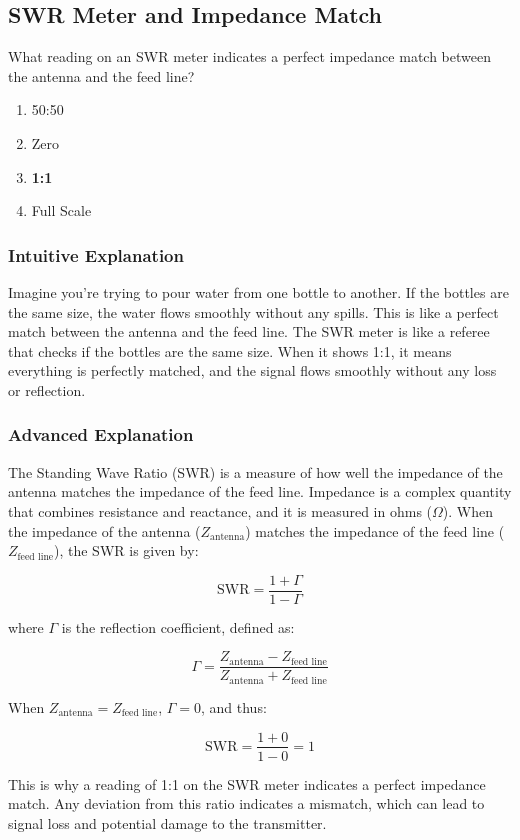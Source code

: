 \subsection{SWR Meter and Impedance Match}
\label{T7C04}

\begin{tcolorbox}[colback=gray!10!white,colframe=black!75!black,title=T7C04]
What reading on an SWR meter indicates a perfect impedance match between the antenna and the feed line?
\begin{enumerate}[label=\Alph*)]
    \item 50:50
    \item Zero
    \item \textbf{1:1}
    \item Full Scale
\end{enumerate}
\end{tcolorbox}

\subsubsection{Intuitive Explanation}
Imagine you're trying to pour water from one bottle to another. If the bottles are the same size, the water flows smoothly without any spills. This is like a perfect match between the antenna and the feed line. The SWR meter is like a referee that checks if the bottles are the same size. When it shows 1:1, it means everything is perfectly matched, and the signal flows smoothly without any loss or reflection.

\subsubsection{Advanced Explanation}
The Standing Wave Ratio (SWR) is a measure of how well the impedance of the antenna matches the impedance of the feed line. Impedance is a complex quantity that combines resistance and reactance, and it is measured in ohms ($\Omega$). When the impedance of the antenna ($Z_{\text{antenna}}$) matches the impedance of the feed line ($Z_{\text{feed line}}$), the SWR is given by:

\[
\text{SWR} = \frac{1 + \Gamma}{1 - \Gamma}
\]

where $\Gamma$ is the reflection coefficient, defined as:

\[
\Gamma = \frac{Z_{\text{antenna}} - Z_{\text{feed line}}}{Z_{\text{antenna}} + Z_{\text{feed line}}}
\]

When $Z_{\text{antenna}} = Z_{\text{feed line}}$, $\Gamma = 0$, and thus:

\[
\text{SWR} = \frac{1 + 0}{1 - 0} = 1
\]

This is why a reading of 1:1 on the SWR meter indicates a perfect impedance match. Any deviation from this ratio indicates a mismatch, which can lead to signal loss and potential damage to the transmitter.

